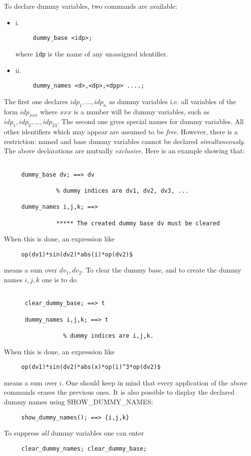 To declare dummy variables, two commands are available:
\begin{itemize}
\item{i.}
\begin{verbatim}
     dummy_base <idp>;
\end{verbatim}
where {\tt idp} is the name of any unassigned identifier.
\item{ii.}
\begin{verbatim}
     dummy_names <d>,<dp>,<dpp> ....;
\end{verbatim}
\end{itemize}
The first one  declares $ idp_1,\ldots, idp_n$ as dummy variables i.e.
all variables of the form $idp_{xxx}$ where $xxx$ is a number
will be dummy variables, such as $idp_1, idp_2,\ldots, idp_{23}$.
The second one gives special names for dummy variables.
All other identifiers which may appear are assumed to be {\em free}.
However, there is a restriction: named and base dummy variables 
cannot be declared {\em simultaneously}. The above declarations are 
mutually {\em exclusive}. 
Here is an example  showing that:
\begin{verbatim}

     dummy_base dv; ==> dv

               % dummy indices are dv1, dv2, dv3, ...

     dummy_names i,j,k; ==> 
                 
               ***** The created dummy base dv must be cleared
\end{verbatim}
When this is done, an expression like 
\begin{verbatim}
     op(dv1)*sin(dv2)*abs(i)*op(dv2)$
\end{verbatim}
means a sum over $dv_1,dv_2$.
To clear the dummy base, and to create the dummy names $i,j,k$ one is 
to do
\begin{verbatim}

      clear_dummy_base; ==> t

      dummy_names i,j,k; ==> t
                
                 % dummy indices are i,j,k.
\end{verbatim}
When this is done, an expression like
\begin{verbatim}
     op(dv1)*sin(dv2)*abs(x)*op(i)^3*op(dv2)$
\end{verbatim}
means a sum over $i$.
One should keep in mind that every application of the above commands 
erases the previous ones. 
It is also possible to display the declared dummy names using 
\f{SHOW\_DUMMY\_NAMES}:
\begin{verbatim}
     show_dummy_names(); ==> {i,j,k}
\end{verbatim}
To suppress {\em all} dummy variables one can enter
\begin{verbatim}
     clear_dummy_names; clear_dummy_base;
\end{verbatim}


